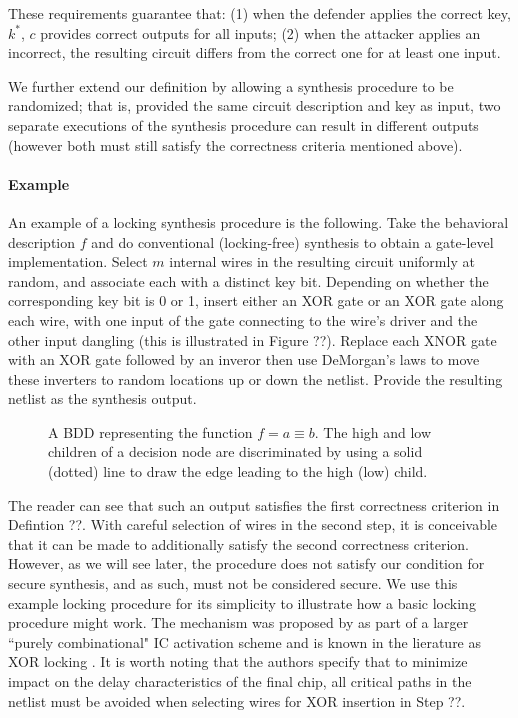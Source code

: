 These requirements guarantee that: (1) when the defender applies the correct key, $k^{*}$,
$c$ provides correct outputs for all inputs; (2) when the attacker applies an incorrect, the resulting circuit differs from the correct one for at least one input.

We further extend our definition by allowing a synthesis procedure to be randomized; that is, provided the same circuit description and key as input, two separate executions of the synthesis procedure can result in different outputs (however both must still satisfy the correctness criteria mentioned above).

\paragraph{Example} An example of a locking synthesis procedure is the following. Take the behavioral description $f$ and do conventional (locking-free) synthesis to obtain a gate-level implementation. Select $m$ internal wires in the resulting circuit uniformly at random, and associate each with a distinct key bit. Depending on whether the corresponding key bit is 0 or 1, insert either an XOR gate or an XOR gate along each wire, with one input of the gate connecting to the wire's driver and the other input dangling (this is illustrated in Figure ??). Replace each XNOR gate with an XOR gate followed by an inveror then use DeMorgan's laws to move these inverters to random locations up or down the netlist. Provide the resulting netlist as the synthesis output.

\newcommand{\dummyfig}[1]{
  \centering
  \fbox{
    \begin{minipage}[c][0.20\textheight][c]{0.45\textwidth}
      \centering{#1}
    \end{minipage}
  }
}

\begin{figure}[h]
  \dummyfig{Dummy Figure Label} 
  \caption{A BDD representing the function $f = a \equiv b$. The high and low children of a decision node are discriminated by using a solid (dotted) line to draw the edge leading to the high (low) child.}
  \label{fig:dummy}
\end{figure}

The reader can see that such an output satisfies the first correctness criterion in Defintion ??. With careful selection of wires in the second step, it is conceivable that it can be made to additionally satisfy the second correctness criterion. However, as we will see later, the procedure does not satisfy our condition for secure synthesis, and as such, must not be considered secure. We use this example locking procedure for its simplicity to illustrate how a basic locking procedure might work. The mechanism was proposed by \cite{} as part of a larger ``purely combinational" IC activation scheme and is known in the lierature as XOR locking \cite{}. It is worth noting that the authors specify that to minimize impact on the delay characteristics of the final chip, all critical paths in the netlist must be avoided when selecting wires for XOR insertion in Step ??.
